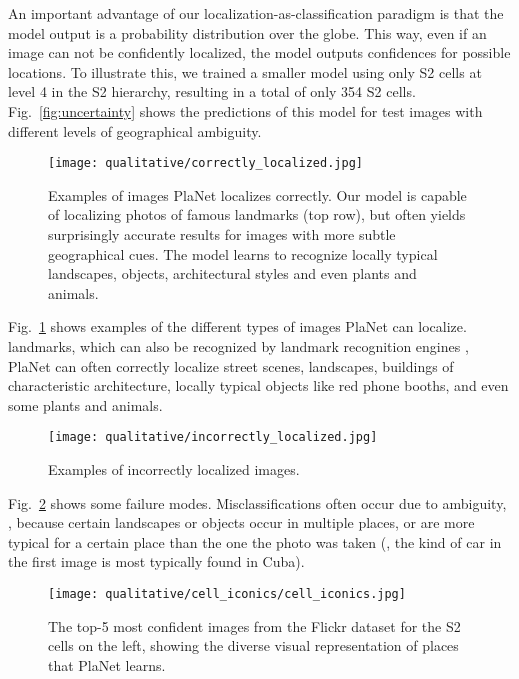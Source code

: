 \documentclass[10pt,twocolumn,letterpaper]{article}
\begin{document}
An important advantage of our localization-as-classification paradigm
is that the model output is a probability distribution over the globe.
This way, even if an image can not be confidently localized, the model
outputs confidences for possible locations. To illustrate this, we
trained a smaller model
using only S2 cells at level 4 in the S2
hierarchy, resulting in a total of only 354 S2 cells.
Fig.~\ref{fig:uncertainty} shows the predictions of this model for
test images with different levels of geographical ambiguity.

\begin{figure}[t]
  \centering
  \texttt{[image: qualitative/correctly\_localized.jpg]}
  \caption{Examples of images PlaNet localizes correctly. Our
model is capable of localizing photos of famous landmarks (top row),
but often yields surprisingly accurate results for images with more
subtle geographical cues. The model learns to recognize locally
typical landscapes, objects, architectural styles and even plants and
animals.}
  \label{fig:correctly_localized}
\end{figure}

Fig.~\ref{fig:correctly_localized} shows examples of the
different types of images PlaNet can localize.
landmarks, which can also be recognized by landmark recognition
engines \cite{Avrithis10MM,Quack08CIVR,Zheng09CVPR}, PlaNet can
often correctly localize street scenes, landscapes, buildings of
characteristic architecture, locally typical objects like red phone
booths, and even some plants and animals.
\begin{figure}[t]
  \centering
  \texttt{[image: qualitative/incorrectly\_localized.jpg]}
  \caption{Examples of incorrectly localized images.}
  \label{fig:incorrectly_localized}
\end{figure}
Fig.~\ref{fig:incorrectly_localized} shows some failure modes.
Misclassifications often occur due to ambiguity, \eg, because certain
landscapes or objects occur in multiple places, or are more typical
for a certain place than the one the photo was taken (\eg, the kind of
car in the first image is most typically found in Cuba).

\begin{figure}[t]
  \centering
  \texttt{[image: qualitative/cell\_iconics/cell\_iconics.jpg]}
  \caption{The top-5 most confident images from the Flickr dataset for
the S2 cells on the left, showing the diverse visual representation of
places that PlaNet learns.}
  \label{fig:cell_iconics}
\end{figure}
\end{document}
